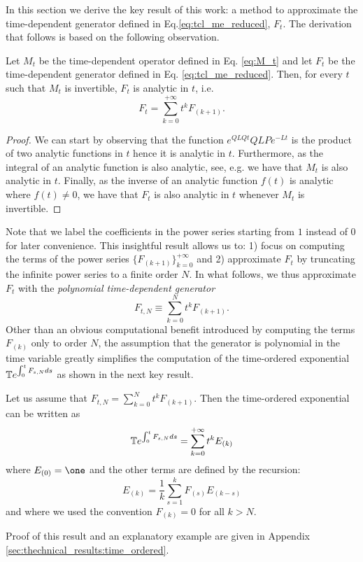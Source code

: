 \documentclass[10pt,aps,pra,twocolumn,showpacs,superscriptaddress,nobalancelastpage,notitlepage,nofootinbib,longbibliography]{revtex4-2}
\begin{document}
In this section we derive the key result of this work: a method to approximate the time-dependent generator defined in Eq.\eqref{eq:tcl_me_reduced}, $F_t$. The derivation that follows is based on the following observation. 
\begin{proposition}
    Let $M_t$ be the time-dependent operator defined in Eq. \eqref{eq:M_t} and let $F_t$ be the time-dependent generator defined in Eq. \eqref{eq:tcl_me_reduced}. Then, for every $t$ such that $M_t$ is invertible, $F_t$ is analytic in $t$, i.e. 
    \[F_t = \sum_{k=0}^{+\infty} t^k F_{(k+1)}.\]
\end{proposition}
\begin{proof}
    We can start by observing that the function $e^{QLQt}QLPe^{-Lt}$ is the product of two analytic functions in $t$ hence it is analytic in $t$. Furthermore, as the integral of an analytic function is also analytic, see, e.g. \cite{bourchtein2021analytic} we have that $M_t$  is also analytic in $t$. Finally, as the inverse of an analytic function $f(t)$ is analytic where $f(t)\neq0$, we have that $F_t$ is also analytic in $t$ whenever $M_t$ is invertible. 
\end{proof}
Note that we label the coefficients in the power series starting from $1$ instead of $0$ for later convenience. This insightful result allows us to: 1) focus on computing the terms of the power series $\{F_{(k+1)}\}_{k=0}^{+\infty}$ and 2) approximate $F_t$ by truncating the infinite power series to a finite order $N$. In what follows, we thus approximate $F_t$ with the {\em polynomial time-dependent generator} 
\[F_{t,N} \equiv \sum_{k=0}^N t^k F_{(k+1)}.\]
Other than an obvious computational benefit introduced by computing the terms $F_{(k)}$ only to order $N$, the assumption that the generator is polynomial in the time variable greatly simplifies the computation of the time-ordered exponential $\mathbb{T} e^{\int_0^t F_{s,N} ds}$ as shown in the next key result. 

\begin{theorem}
\label{thm:time_ordered_expansion}
    Let us assume that \(F_{t,N} = \sum_{k=0}^{N} t^k F_{(k+1)}\). 
    Then the time-ordered exponential can be written as
    \begin{equation}
        \mathbb{T} e^{\int_0^t F_{s,N} ds} = \sum_{k=0}^{+\infty} t^k E_{(k)}
        \label{eqn:time_ordered_expansion}
    \end{equation}
    where $E_{(0)}=\one$ and the other terms are defined by the recursion:
    \begin{equation}
        E_{(k)} =  \frac{1}{k} \sum_{s=1}^{k} F_{(s)}E_{(k-s)}
        \label{eqn:E_k}
    \end{equation}
    and where we used the convention $F_{(k)}=0$ for all $k>N$.
\end{theorem}
Proof of this result and an explanatory example are given in Appendix \ref{sec:thechnical_results:time_ordered}.
\end{document}
